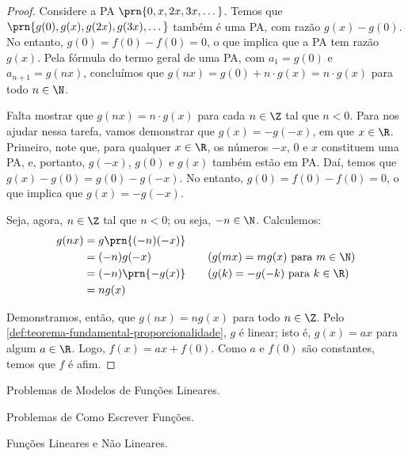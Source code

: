 \begin{proof}
    Considere a PA $\prn{0, x, 2x, 3x, \dots}$. Temos que $\prn{g(0), g(x), g(2x), g(3x), \dots}$
    também é uma PA, com razão $g(x)-g(0)$. No entanto, $g(0) = f(0)-f(0) = 0$, o que implica que a PA tem
    razão $g(x)$. Pela fórmula do termo geral de uma PA, com $a_1 = g(0)$ e $a_{n+1} = g(nx)$,
    concluímos que $g(nx) = g(0) + n\cdot g(x) = n\cdot g(x)$
    para todo $n \in \N$.

    Falta mostrar que $g(nx) = n \cdot g(x)$ para cada $n \in \Z$ tal que $n < 0$.
    Para nos ajudar nessa tarefa, vamos demonstrar que $g(x) = -g(-x)$, em que $x \in \R$. 
    Primeiro, note que, para qualquer $x \in \R$, os números $-x$, $0$ e $x$
    constituem uma PA, e, portanto, $g(-x)$, $g(0)$ e $g(x)$ também estão em PA. Daí, temos que $g(x) - g(0) = 
    g(0)-g(-x)$. No entanto, $g(0) = f(0) - f(0) = 0$, o que implica que $g(x) = -g(-x)$.

    Seja, agora, $n \in \Z$ tal que $n < 0$; ou seja, $-n \in \N$. Calculemos:
    \begin{alignat*}{3}
        g(nx) &= g\prn{(-n)(-x)} &&  \\
        &= (-n)g(-x) && \quad\text{($g(mx) = mg(x)$ para $m\in\N$)} \\
        &= (-n)\prn{-g(x)} && \quad\text{($g(k) = -g(-k)$ para $k \in \R$)} \\
        &= ng(x)
    \end{alignat*}

    Demonstramos, então, que $g(nx) = ng(x)$ para todo $n \in \Z$. Pelo \ref{def:teorema-fundamental-proporcionalidade},
    $g$ é linear; isto é, $g(x) = ax$ para algum $a \in \R$. Logo, $f(x) = ax + f(0)$. Como $a$ e $f(0)$ são constantes,
    temos que $f$ é afim.

    
 \end{proof}

\begin{onlineact}
    {Problemas de Modelos de Funções Lineares}.
\end{onlineact}

\begin{onlineact}
    {Problemas de Como Escrever Funções}.
\end{onlineact}

\begin{onlineact}
    {Funções Lineares e Não Lineares}.
\end{onlineact}